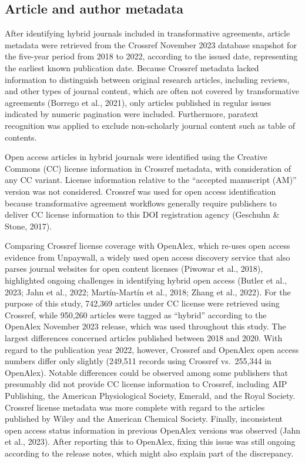 \documentclass[a4paper,man,floatsintext,longtable,noextraspace,12pt]{apa6}
\begin{document}
\subsection{Article and author
metadata}\label{article-and-author-metadata}

After identifying hybrid journals included in transformative agreements,
article metadata were retrieved from the Crossref November 2023 database
snapshot for the five-year period from 2018 to 2022, according to the
issued date, representing the earliest known publication date. Because
Crossref metadata lacked information to distinguish between original
research articles, including reviews, and other types of journal
content, which are often not covered by transformative agreements
(Borrego et al., 2021), only articles published in regular issues
indicated by numeric pagination were included. Furthermore, paratext
recognition was applied to exclude non-scholarly journal content such as
table of contents.

Open access articles in hybrid journals were identified using the
Creative Commons (CC) license information in Crossref metadata, with
consideration of any CC variant. License information relative to the
``accepted manuscript (AM)'' version was not considered. Crossref was
used for open access identification because transformative agreement
workflows generally require publishers to deliver CC license information
to this DOI registration agency (Geschuhn \& Stone, 2017).

Comparing Crossref license coverage with OpenAlex, which re-uses open
access evidence from Unpaywall, a widely used open access discovery
service that also parses journal websites for open content licenses
(Piwowar et al., 2018), highlighted ongoing challenges in identifying
hybrid open access (Butler et al., 2023; Jahn et al., 2022;
Martín-Martín et al., 2018; Zhang et al., 2022). For the purpose of this
study, 742,369 articles under CC license were retrieved using Crossref,
while 950,260 articles were tagged as ``hybrid'' according to the
OpenAlex November 2023 release, which was used throughout this study.
The largest differences concerned articles published between 2018 and
2020. With regard to the publication year 2022, however, Crossref and
OpenAlex open access numbers differ only slightly (249,511 records using
Crossref vs.~255,344 in OpenAlex). Notable differences could be observed
among some publishers that presumably did not provide CC license
information to Crossref, including AIP Publishing, the American
Physiological Society, Emerald, and the Royal Society. Crossref license
metadata was more complete with regard to the articles published by
Wiley and the American Chemical Society. Finally, inconsistent open
access status information in previous OpenAlex versions was observed
(Jahn et al., 2023). After reporting this to OpenAlex, fixing this issue
was still ongoing according to the release notes, which might also
explain part of the discrepancy.
\end{document}
